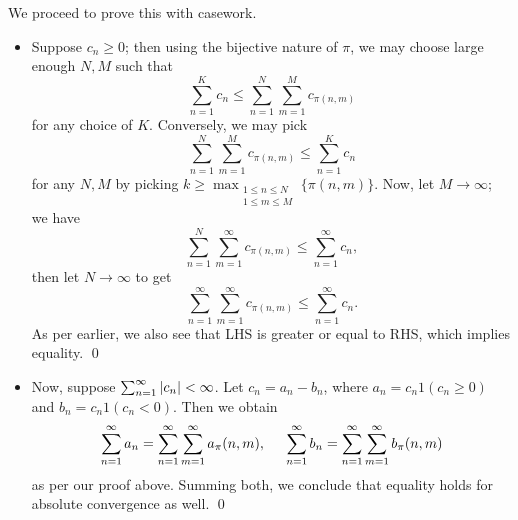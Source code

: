 \newpage
\noindent We proceed to prove this with casework.
\begin{itemize}
    \item Suppose $c_n \geq 0$; then using the bijective nature of $\pi$, we may choose large enough $N, M$ such that
    \[ \sum_{n=1}^K c_n \leq \sum_{n=1}^N \sum_{m=1}^M c_{\pi(n, m)} \]
    for any choice of $K$. Conversely, we may pick
    \[ \sum_{n=1}^N \sum_{m=1}^M c_{\pi(n, m)} \leq \sum_{n=1}^K c_n \]
    for any $N, M$ by picking $k \geq \max_{\substack{1 \leq n \leq N \\ 1 \leq m \leq M}}\{\pi(n, m)\}$.
    Now, let $M \to \infty$; we have
    \[ \sum_{n=1}^N \sum_{m=1}^\infty c_{\pi(n, m)} \leq \sum_{n=1}^\infty c_n, \]
    then let $N \to \infty$ to get
    \[ \sum_{n=1}^\infty \sum_{m=1}^\infty c_{\pi(n, m)} \leq \sum_{n=1}^\infty c_n. \]
    As per earlier, we also see that LHS is greater or equal to RHS, which implies equality. \qed

    \item Now, suppose $\sum_{n=1}^\infty \left\lvert c_n \right\rvert < \infty$. Let $c_n = a_n - b_n$, where $a_n = c_n 1(c_n \geq 0)$ and $b_n = c_n 1(c_n < 0)$. Then we obtain
    \[ \sum_{n=1}^\infty a_n = \sum_{n=1}^\infty \sum_{m=1}^\infty a_\pi(n, m), \hspace{0.2in} \sum_{n=1}^\infty b_n = \sum_{n=1}^\infty \sum_{m=1}^\infty b_\pi(n, m) \]
    as per our proof above. Summing both, we conclude that equality holds for absolute convergence as well. \qed
\end{itemize}

